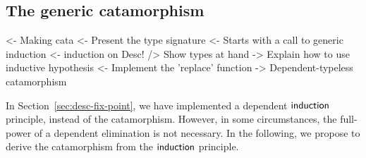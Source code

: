 \subsection{The generic catamorphism}

\begin{wstructure}
<- Making cata
    <- Present the type signature
    <- Starts with a call to generic induction
        <- induction on Desc!
        /> Show types at hand
        -> Explain how to use inductive hypothesis
    <- Implement the 'replace' function
    -> Dependent-typeless catamorphism 
\end{wstructure}

In Section~\ref{sec:desc-fix-point}, we have implemented a dependent
$\F{induction}$ principle, instead of the catamorphism. However, in
some circumstances, the full-power of a dependent elimination is not
necessary. In the following, we propose to derive the catamorphism
from the $\F{induction}$ principle.

\newcommand{\cata}{\F{cata}}


